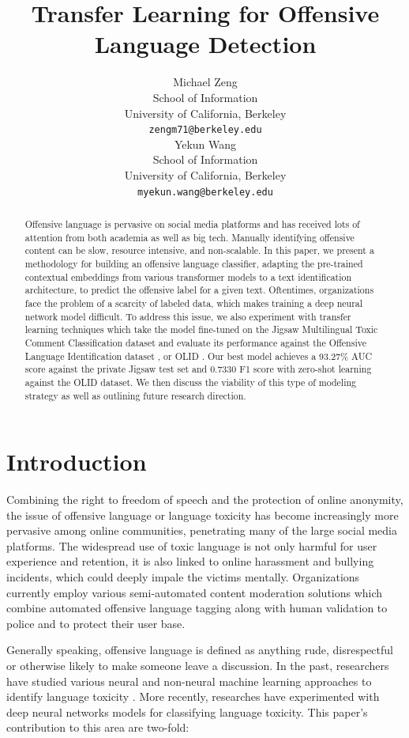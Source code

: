 \documentclass[11pt,a4paper]{article}
\title{Transfer Learning for Offensive Language Detection}
\author{Michael Zeng\\
  School of Information\\
  University of California, Berkeley \\
  {\tt zengm71@berkeley.edu} \\\And
  Yekun  Wang\\
  School of Information\\
  University of California, Berkeley \\
  {\tt myekun.wang@berkeley.edu} \\}
\date{}
\begin{document}
\maketitle
\begin{abstract}
Offensive language is pervasive on social media platforms and has received lots of attention from both academia as well as big tech. Manually identifying offensive content can be slow, resource intensive, and non-scalable. In this paper, we present a methodology for building an offensive language classifier, adapting the pre-trained contextual embeddings from various transformer models to a text identification architecture, to predict the offensive label for a given text. Oftentimes, organizations face the problem of a scarcity of labeled data, which makes training a deep neural network model difficult. To address this issue, we also experiment with transfer learning techniques which take the model fine-tuned on the Jigsaw Multilingual Toxic Comment Classification dataset and evaluate its performance against the Offensive Language Identification dataset \citep{zampierietal2019}, or OLID . Our best model achieves a 93.27\% AUC score against the private Jigsaw test set and 0.7330 F1 score with zero-shot learning against the OLID dataset. We then discuss the viability of this type of modeling strategy as well as outlining future research direction. 
\end{abstract}

\section{Introduction}
Combining the right to freedom of speech and the protection of online anonymity, the issue of offensive language or language toxicity has become increasingly more pervasive among online communities, penetrating many of the large social media platforms. The widespread use of toxic language is not only harmful for user experience and retention, it is also linked to online harassment and bullying incidents, which could deeply impale the victims mentally. Organizations currently employ various semi-automated content moderation solutions which combine automated offensive language tagging along with human validation to police and to protect their user base. 

Generally speaking, offensive language is defined as anything rude, disrespectful or otherwise likely to make someone leave a discussion. In the past, researchers have studied various neural and non-neural machine learning approaches to identify language toxicity \citep{schmidt-wiegand-2017-survey}. More recently, researches have experimented with deep neural networks models for classifying language toxicity. This paper’s contribution to this area are two-fold: 
\end{document}
